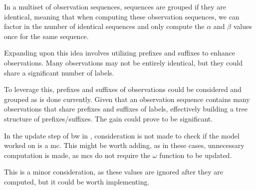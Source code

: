 In a multiset of observation sequences, sequences are grouped if they are identical, meaning that when computing these observation sequences, we can factor in the number of identical sequences and only compute the $\alpha$ and $\beta$ values once for the same sequence.

Expanding upon this idea involves utilizing prefixes and suffixes to enhance observations.
Many observations may not be entirely identical, but they could share a significant number of labels.

To leverage this, prefixes and suffixes of observations could be considered and grouped as is done currently.
Given that an observation sequence contains many observations that share prefixes and suffixes of labels, effectively building a tree structure of prefixes/suffixes.
The gain could prove to be significant.

In the update step of \gls{bw} in \Cupaal, consideration is not made to check if the model worked on is a \gls{mc}.
This might be worth adding, as in these cases, unnecessary computation is made, as \glspl{mc} do not require the $\omega$ function to be updated.

This is a minor consideration, as these values are ignored after they are computed, but it could be worth implementing.
